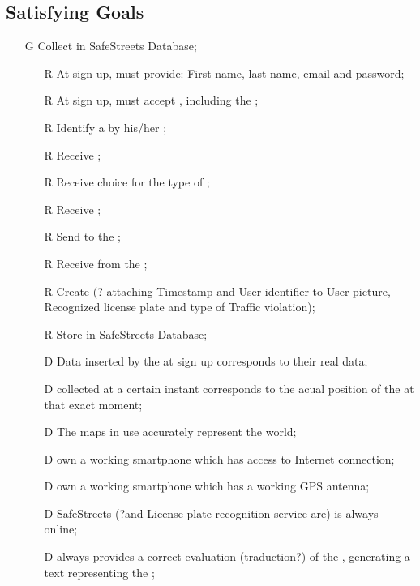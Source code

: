 \documentclass[../../../rasd.tex]{subfiles}
\begin{document}
\subsection{Satisfying Goals\label{sect:3.2.6}}
\begin{itemize}
	\item[G\subs{1}]Collect  in SafeStreets Database;
	\begin{itemize}
		\item[R\subs{1}]At sign up,  must provide: First name, last name, email and password;
		\item[R\subs{2}]At sign up,  must accept , including the ;
		\item[R\subs{3}]Identify a  by his/her ;
		\item[R\subs{4}]Receive ;
		\item[R\subs{5}]Receive  choice for the type of ;
		\item[R\subs{6}]Receive ;
		\item[R\subs{7}]Send  to the ;
		\item[R\subs{8}]Receive  from the ;
		\item[R\subs{9}]Create  (? attaching Timestamp and User identifier to User picture, Recognized license plate and type of Traffic violation);
		\item[R\subs{10}]Store  in SafeStreets Database;
		\\
		\item[D\subs{1}]Data inserted by the  at sign up corresponds to their real data;
		\item[D\subs{2}] collected at a certain instant corresponds to the acual position of the  at that exact moment;
		\item[D\subs{3}]The maps in use accurately represent the world;
		\item[D\subs{4}] own a working smartphone which has access to Internet connection;
		\item[D\subs{5}] own a working smartphone which has a working GPS antenna;
		\item[D\subs{6}]SafeStreets (?and License plate recognition service are) is always online;
		\item[D\subs{7}] always provides a correct evaluation (traduction?) of the , generating a text representing the ;
	\end{itemize}


\end{itemize}
\end{document}
